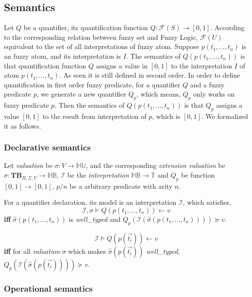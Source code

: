 \subsection{Semantics}
Let $Q$ be a quantifier, its quantification function $Q : \mathcal{F}(S) \rightarrow [0,1]$. According to the corresponding relation between fuzzy set and Fuzzy Logic, $\mathcal{F}(U)$ equivalent to the set of all interpretations of fuzzy atom. Suppose $p(t_1,...,t_n)$ is an fuzzy atom, and its interpretation is $I$. The semantics of $Q(p(t_1,...,t_n))$ is that quantification function $Q$ assigns a value in $[0,1]$ to the interpretation $I$ of atom $p(t_1,...,t_n)$. As seen it is still defined in second order. In order to define quantification in first order fuzzy predicate, for a quantifier $Q$ and a fuzzy predicate $p$, we generate a new quantifier $Q_p$, which means, $Q_p$ only works on fuzzy predicate $p$. Then the semantics of $Q(p(t_1,...,t_n))$ is that $Q_p$ assigns a value $[0,1]$ to the result from interpretation of $p$, which is $[0,1]$. We formalized it as follows.

\subsubsection{Declarative semantics}
\label{sec:DeclativeSemanticQuantification}
Let \textit{valuation} be $\sigma : V \rightarrow \mathbb{HU}$, and the corresponding 
\textit{extension valuation} be $\hat{\sigma}: \textbf{TB}_{\Pi,\Sigma,V} \rightarrow \mathbb{HB}$,
$\mathcal{I}$ be the \textit{interpretation} $\mathbb{HB} \rightarrow \mathbb{T}$ and $Q_p$ be function $[0,1] \rightarrow [0,1]$, $p/n$ be a arbitrary predicate with arity $n$. 

For a quantifier declaration, its model is an interpretation $\mathcal{I}$, which satisfies,
\[\mathcal{I},\sigma \models Q(p(t_1,...,t_n)) \leftarrow v\] \textbf{iff} $\hat{\sigma}(p(t_1,...,t_n))$ is \textit{well\_typed} and $Q_p(\mathcal{I}(\hat{\sigma}(p(t_1,...,t_n)))) \succeq v$.

\[\mathcal{I} \models Q(p(\vec{t_i})) \leftarrow v\] \textbf{iff} for all \textit{valuation} $\sigma$ which makes $\hat{\sigma}(p(\vec{t_i}))$ \textit{well\_typed}, $Q_p(\mathcal{I}(\hat{\sigma}(p(\vec{t_i})))) \succeq v$.

\subsubsection{Operational semantics}
\label{sec:OperationalSemanticQuantification}

